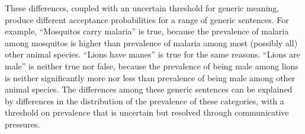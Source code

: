 \documentclass[10pt,letterpaper]{article}
\begin{document}
These differences, coupled with an uncertain threshold for generic meaning, produce different acceptance probabilities for a range of generic sentences. For example, ``Mosquitos carry malaria'' is true, because the prevalence of malaria among mosquitos is higher than prevalence of malaria among most (possibly all) other animal species. ``Lions have manes'' is true for the same reasons. ``Lions are male'' is neither true nor false, because the prevalence of being male among lions is neither significantly more nor less than prevalence of being male among other animal species. The differences among these generic sentences can be explained by differences in the distribution of the prevalence of these categories, with a threshold on prevalence that is uncertain but resolved through communicative pressures.




\end{document}
